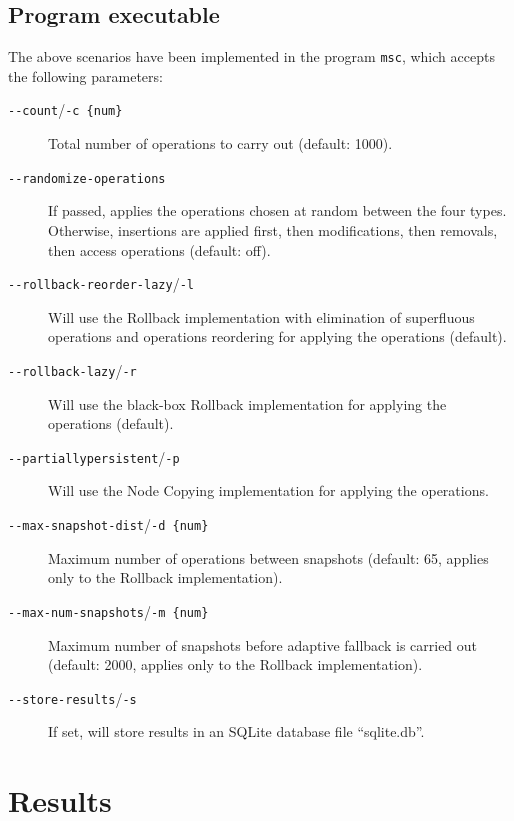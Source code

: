 \subsection{Program executable}

The above scenarios have been implemented in the program \texttt{msc}, which
accepts the following parameters:

\begin{description}

  \item[\texttt{-\@{}-count}/\texttt{-c \{num\}}] Total number of operations to carry
  out (default: 1000).

  \item[\texttt{-\@{}-randomize-operations}] If passed, applies the operations
  chosen at random between the four types. Otherwise, insertions are applied
  first, then modifications, then removals, then access operations (default:
  off).

  \item[\texttt{-\@{}-rollback-reorder-lazy}/\texttt{-l}] Will use the Rollback
  implementation with elimination of superfluous operations and operations
  reordering for applying the operations (default).

  \item[\texttt{-\@{}-rollback-lazy}/\texttt{-r}] Will use the black-box
  Rollback implementation for applying the operations (default).

  \item[\texttt{-\@{}-partiallypersistent}/\texttt{-p}] Will use the Node
  Copying implementation for applying the operations.

  \item[\texttt{-\@{}-max-snapshot-dist}/\texttt{-d \{num\}}] Maximum number of
  operations between snapshots (default: 65, applies only to the Rollback
  implementation).

  \item[\texttt{-\@{}-max-num-snapshots}/\texttt{-m \{num\}}] Maximum number of
  snapshots before adaptive fallback is carried out (default: 2000, applies only to the Rollback
  implementation).

  \item[\texttt{-\@{}-store-results}/\texttt{-s}] If set, will store results in
  an SQLite database file ``sqlite.db''.

\end{description}

\section{Results}

